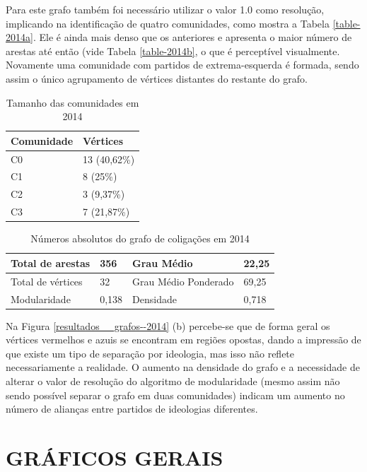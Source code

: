Para este grafo também foi necessário utilizar o valor 1.0 como resolução, implicando na identificação de quatro comunidades, como mostra a Tabela \ref{table-2014a}. Ele é ainda mais denso que os anteriores e apresenta o maior número de arestas até então (vide Tabela \ref{table-2014b}, o que é perceptível visualmente. Novamente uma comunidade com partidos de extrema-esquerda é formada, sendo assim o único agrupamento de vértices distantes do restante do grafo.
\begin{table}[H]
\centering
\label{table-2010b}
\begin{tabular}{|l|l|}
\hline
Comunidade & Vértices \\ \hline
C0         &     13 (40,62\%)                \\ \hline
C1         &     8 (25\%)                \\ \hline
C2         &       3 (9,37\%)               \\ \hline
C3         &       7 (21,87\%)               \\ \hline
\end{tabular}
\caption{Tamanho das comunidades em 2014}
\end{table}


\begin{table}[H]
\centering
\label{table-2010a}
\begin{tabular}{|l|l|l|l|}
\hline
Total de arestas  & 356 & Grau Médio           & 22,25 \\ \hline
Total de vértices & 32 & Grau Médio Ponderado & 69,25 \\ \hline
Modularidade      & 0,138 & Densidade            & 0,718 \\ \hline
\end{tabular}
\caption{Números absolutos do grafo de coligações em 2014}
\end{table}

Na Figura \ref{resultados__grafos--2014} (b) percebe-se que de forma geral os vértices vermelhos e azuis se encontram em regiões opostas, dando a impressão de que existe um tipo de separação por ideologia, mas isso não reflete necessariamente a realidade. O aumento na densidade do grafo e a necessidade de alterar o valor de resolução do algoritmo  de modularidade (mesmo assim não sendo possível separar o grafo em duas comunidades) indicam um aumento no número de alianças entre partidos de ideologias diferentes.

\section{\texorpdfstring{\MakeUppercase{Gráficos Gerais}}{}}
\label{resultados__graficos-gerais}


